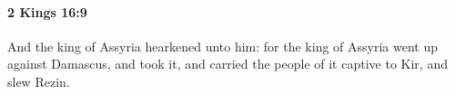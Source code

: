 
		\paragraph{2 Kings 16:9} %
			\label{2KINGS-16-9}

			And the king of Assyria hearkened unto him: for the king of Assyria went up against Damascus, and took it, and carried the people of it captive to Kir, and slew Rezin.


